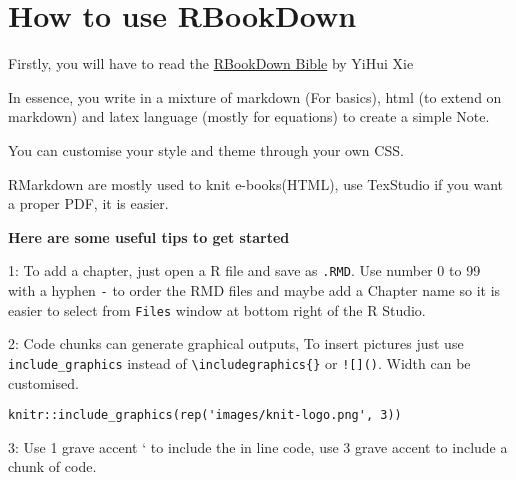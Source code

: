 \documentclass[
]{book}
\begin{document}
\hypertarget{how-to-use-rbookdown}{%
\chapter*{How to use RBookDown}\label{how-to-use-rbookdown}}

Firstly, you will have to read the \href{https://bookdown.org/yihui/bookdown/}{RBookDown Bible} by YiHui Xie

In essence, you write in a mixture of markdown (For basics), html (to extend on markdown) and latex language (mostly for equations) to create a simple Note.

You can customise your style and theme through your own CSS.

RMarkdown are mostly used to knit e-books(HTML), use TexStudio if you want a proper PDF, it is easier.

\textbf{Here are some useful tips to get started}

1: To add a chapter, just open a R file and save as \texttt{.RMD}. Use number 0 to 99 with a hyphen \texttt{-} to order the RMD files and maybe add a Chapter name so it is easier to select from \texttt{Files} window at bottom right of the R Studio.

2: Code chunks can generate graphical outputs, To insert pictures just use \texttt{include\_graphics} instead of \texttt{\textbackslash{}includegraphics\{\}} or \texttt{!{[}{]}()}. Width can be customised.

\begin{verbatim}
knitr::include_graphics(rep('images/knit-logo.png', 3))
\end{verbatim}

3: Use 1 grave accent ` to include the in line code, use 3 grave accent to include a chunk of code.

  
\end{document}
